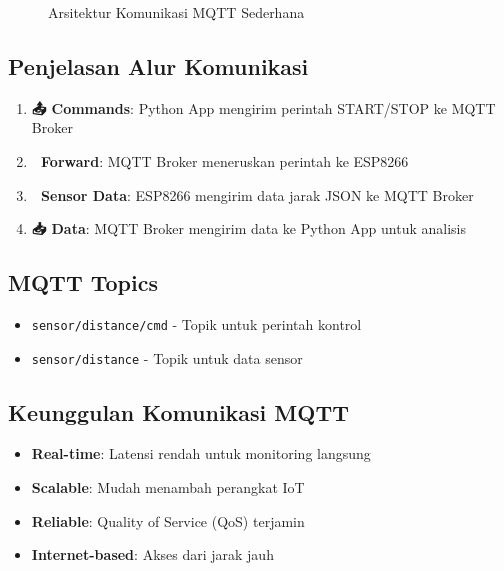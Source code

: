\documentclass[a4paper,10pt]{article}
\begin{document}
\begin{figure}[H]
\caption{Arsitektur Komunikasi MQTT Sederhana}
\end{figure}

\subsection{Penjelasan Alur Komunikasi}

\begin{enumerate}
\item \textbf{📤 Commands}: Python App mengirim perintah START/STOP ke MQTT Broker
\item \textbf{🔄 Forward}: MQTT Broker meneruskan perintah ke ESP8266
\item \textbf{📡 Sensor Data}: ESP8266 mengirim data jarak JSON ke MQTT Broker
\item \textbf{📥 Data}: MQTT Broker mengirim data ke Python App untuk analisis
\end{enumerate}

\subsection{MQTT Topics}
\begin{itemize}
\item \texttt{sensor/distance/cmd} - Topik untuk perintah kontrol
\item \texttt{sensor/distance} - Topik untuk data sensor
\end{itemize}

\subsection{Keunggulan Komunikasi MQTT}
\begin{itemize}
\item \textbf{Real-time}: Latensi rendah untuk monitoring langsung
\item \textbf{Scalable}: Mudah menambah perangkat IoT
\item \textbf{Reliable}: Quality of Service (QoS) terjamin
\item \textbf{Internet-based}: Akses dari jarak jauh
\end{itemize}
\end{document}
